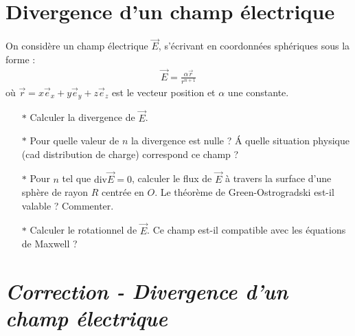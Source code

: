 \documentclass{report}
\begin{document}
\section*{Divergence d'un champ électrique}

On considère un champ électrique $\vec{E}$, s'écrivant en coordonnées sphériques sous la forme :
\begin{align*}
  \vec{E}=\frac{\alpha\vec{r}}{r^{n+1}}
\end{align*}
où $\vec{r}=x\vec{e}_x+y\vec{e}_y+z\vec{e}_z$ est le vecteur position et $\alpha$ une constante.
\begin{itemize}

	\item[$\ast$] Calculer la divergence de $\vec{E}$.
	
	\item[$\ast$] Pour quelle valeur de $n$ la divergence est nulle ? \'A quelle situation physique (cad distribution de charge) correspond ce champ ? 
	
	\item[$\ast$] Pour $n$ tel que $\mathrm{div}\vec{E}=0$, calculer le flux de $\vec{E}$ à travers la surface d'une sphère de rayon $R$ centrée en $O$. Le théorème de Green-Ostrogradski est-il valable ? Commenter.
	
	\item[$\ast$] Calculer le rotationnel de $\vec{E}$. Ce champ est-il compatible avec les équations de Maxwell ?

\end{itemize}

\newpage

\section*{\textit{Correction - Divergence d'un champ électrique}}
\end{document}

